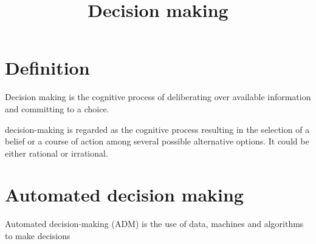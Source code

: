 \documentclass[a4paper]{article}
\title{Decision making}
\date{}
\begin{document}
    \maketitle
    \section{Definition}

\cite{gold-2007-the-neural-basis-of-decision-making}
Decision making is the cognitive process of deliberating over available information and committing to a choice.
    
    decision-making is regarded as the cognitive process resulting in the selection of a belief or a course of action among several possible alternative options. It could be either rational or irrational.
    
    \section{Automated decision making}
        Automated decision-making (ADM) is the use of data, machines and algorithms to make decisions
\end{document}
